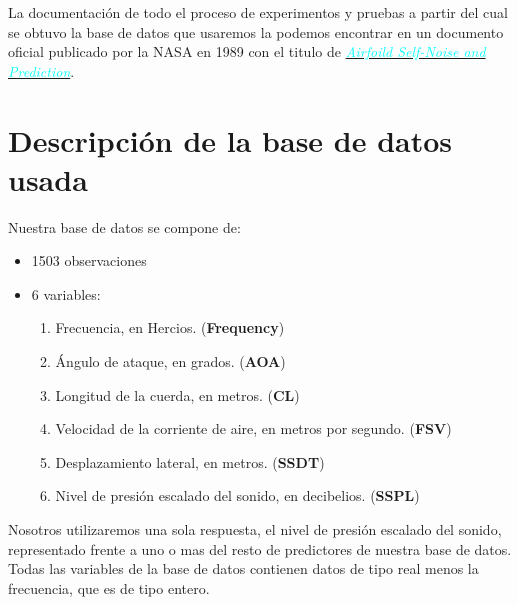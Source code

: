 La documentación de todo el proceso de experimentos y pruebas a partir del cual se obtuvo la base de datos que usaremos la podemos encontrar en un documento oficial publicado por la NASA en 1989 con el titulo de \href{http://ntrs.nasa.gov/archive/nasa/casi.ntrs.nasa.gov/19890016302.pdf}{\textcolor{cyan}{\emph{Airfoild Self-Noise and Prediction}}}.


\section{Descripción de la base de datos usada}

Nuestra base de datos se compone de:
\begin{itemize}

	\item 1503 observaciones

	\item 6 variables:

	\begin{enumerate}
		\item Frecuencia, en Hercios. (\textbf{Frequency})
		\item Ángulo de ataque, en grados. (\textbf{AOA})
		\item Longitud de la cuerda, en metros. (\textbf{CL})
		\item Velocidad de la corriente de aire, en metros por segundo. (\textbf{FSV})
		\item Desplazamiento lateral, en metros. (\textbf{SSDT})
		\item Nivel de presión escalado del sonido, en decibelios. (\textbf{SSPL})
	\end{enumerate}

\end{itemize}

Nosotros utilizaremos una sola respuesta, el nivel de presión escalado del sonido, representado frente a uno o mas del resto de predictores de nuestra base de datos.\\

	
	Todas las variables de la base de datos contienen datos de tipo real menos la frecuencia, que es de tipo entero.
\newpage

